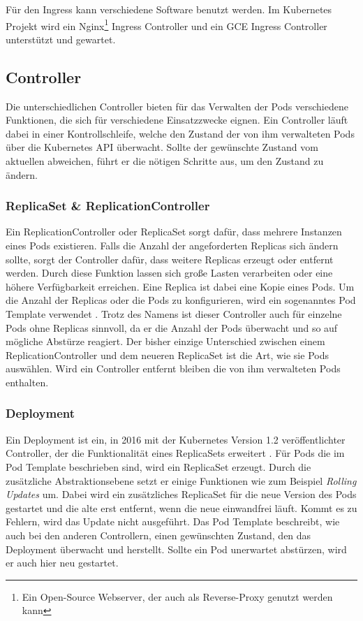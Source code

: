 Für den Ingress kann verschiedene Software benutzt werden. Im Kubernetes Projekt wird ein Nginx\footnote{\label{foot:nginx}Ein Open-Source Webserver, der auch als Reverse-Proxy genutzt werden kann} Ingress Controller und ein \ac{GCE} Ingress Controller unterstützt und gewartet.
%

\subsection{Controller}
Die unterschiedlichen Controller bieten für das Verwalten der Pods verschiedene Funktionen, die sich für verschiedene Einsatzzwecke eignen. Ein Controller läuft dabei in einer Kontrollschleife, welche den Zustand der von ihm verwalteten Pods über die Kubernetes API überwacht. Sollte der gewünschte Zustand vom aktuellen abweichen, führt er die nötigen Schritte aus, um den Zustand zu ändern.

\subsubsection{ReplicaSet \& ReplicationController}
Ein ReplicationController oder ReplicaSet sorgt dafür, dass mehrere Instanzen eines Pods existieren. Falls die Anzahl der angeforderten Replicas sich ändern sollte, sorgt der Controller dafür, dass weitere Replicas erzeugt oder entfernt werden. Durch diese Funktion lassen sich große Lasten verarbeiten oder eine höhere Verfügbarkeit erreichen. Eine Replica ist dabei eine Kopie eines Pods. Um die Anzahl der Replicas oder die Pods zu konfigurieren, wird ein sogenanntes Pod Template verwendet \cite{Rensin2015Kubernetes43826}. Trotz des Namens ist dieser Controller auch für einzelne Pods ohne Replicas sinnvoll, da er die Anzahl der Pods überwacht und so auf mögliche Abstürze reagiert.
Der bisher einzige Unterschied zwischen einem ReplicationController und dem neueren ReplicaSet ist die Art, wie sie Pods auswählen. Wird ein Controller entfernt bleiben die von ihm verwalteten Pods enthalten.

\subsubsection{Deployment}
\label{kube:deployment}
Ein Deployment ist ein, in 2016 mit der Kubernetes Version 1.2 veröffentlichter Controller, der die Funktionalität eines ReplicaSets erweitert \cite[][]{9781788994729}. Für Pods die im Pod Template beschrieben sind, wird ein ReplicaSet erzeugt. Durch die zusätzliche Abstraktionsebene setzt er einige Funktionen wie zum Beispiel \textit{Rolling Updates} um. Dabei wird ein zusätzliches ReplicaSet für die neue Version des Pods gestartet und die alte erst entfernt, wenn die neue einwandfrei läuft. Kommt es zu Fehlern, wird das Update nicht ausgeführt.
Das Pod Template beschreibt, wie auch bei den anderen Controllern, einen gewünschten Zustand, den das Deployment überwacht und herstellt. Sollte ein Pod unerwartet abstürzen, wird er auch hier neu gestartet. \medskip

